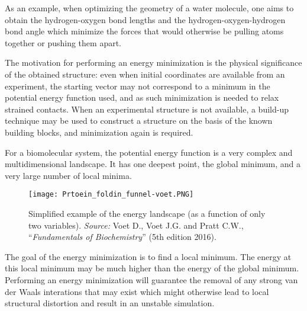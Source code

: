 As an example, when optimizing the geometry of a water molecule, one aims to obtain the hydrogen-oxygen bond lengths and the hydrogen-oxygen-hydrogen bond angle which minimize the forces that would otherwise be pulling atoms together or pushing them apart.

The motivation for performing an energy minimization is the physical significance of the obtained structure: even when initial coordinates are available from an experiment, the starting vector may not correspond to a minimum in the potential energy function used, and as such minimization is needed to relax strained contacts. When an experimental structure is not available, a build-up technique may be used to construct a structure on the basis of the known building blocks, and minimization again is required.

For a biomolecular system, the potential energy function is a very complex and multidimensional landscape. It has one deepest point, the global minimum, and a very large number of local minima. 

\begin{figure}[h]
\centering
\begin{minipage}[t]{0.875\textwidth}
\centering
\texttt{[image: Prtoein\_foldin\_funnel-voet.PNG]}

\caption{\small{Simplified example of the energy landscape (as a function of only two variables).
	\textit{Source:} Voet D., Voet J.G. and Pratt C.W., ``\textit{Fundamentals of Biochemistry}'' (5th edition 2016)\cite{voet2016fundamentals}.}
}
 
\label{fig:induced-fit}
\end{minipage} 
\end{figure}

The goal of the energy minimization is to find a local minimum. The energy at this local minimum may be much higher than the energy of the global minimum. Performing an energy minimization will guarantee the removal of any strong van der Waals interations that may exist which might otherwise lead to local structural distortion and result in an unstable simulation.


